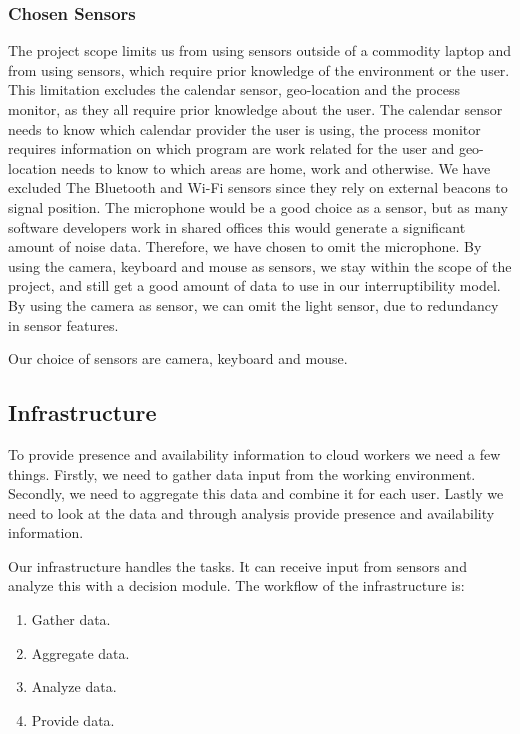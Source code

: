 \documentclass{sigchi}
\begin{document}
\subsubsection{Chosen Sensors}
The project scope limits us from using sensors outside of a commodity laptop and from using sensors, which require prior knowledge of the environment or the user.
This limitation excludes the calendar sensor, geo-location and the process monitor, as they all require prior knowledge about the user.
The calendar sensor needs to know which calendar provider the user is using, the process monitor requires information on which program are work related for the user and geo-location needs to know to which areas are home, work and otherwise.
We have excluded The Bluetooth and Wi-Fi sensors since they rely on external beacons to signal position.
The microphone would be a good choice as a sensor, but as many software developers work in shared offices this would generate a significant amount of noise data.
Therefore, we have chosen to omit the microphone.
By using the camera, keyboard and mouse as sensors, we stay within the scope of the project, and still get a good amount of data to use in our interruptibility model.
By using the camera as sensor, we can omit the light sensor, due to redundancy in sensor features.

Our choice of sensors are camera, keyboard and mouse.

\subsection{Infrastructure}
To provide presence and availability information to cloud workers we need a few things.
Firstly, we need to gather data input from the working environment.
Secondly, we need to aggregate this data and combine it for each user.
Lastly we need to look at the data and through analysis provide presence and availability information.

Our infrastructure handles the tasks.
It can receive input from sensors and analyze this with a decision module.
The workflow of the infrastructure is:

\begin{enumerate}%
  \item Gather data.
  \item Aggregate data.
  \item Analyze data.
  \item Provide data.
\end{enumerate}
\end{document}
